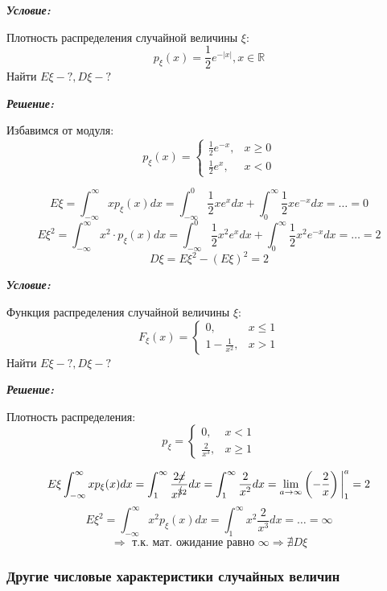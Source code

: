 \begin{exmp}
	\noindent\textit{\textbf{Условие:}}
	
	Плотность распределения случайной величины $\xi$:
	\[
	p_{\xi} (x) = \frac{1}{2} e^{-|x|}, x \in \mathbb{R}
	\]
	Найти $E\xi - ?, D\xi - ?$
	
	\noindent\textit{\textbf{Решение:}}
	
	Избавимся от модуля:
	\[
	p_{\xi}(x) =
	\begin{cases}
		\frac{1}{2} e^{-x}, &x \ge 0 \\
		\frac{1}{2} e^x, &x < 0
	\end{cases}
	\]
	
	\[
	E\xi = \int_{-\infty}^{\infty} x p_{\xi} (x) dx = \int_{-\infty}^{0} \frac{1}{2} x e^x dx + \int_{0}^{\infty} \frac{1}{2} x e^{-x} dx = \dots = 0
	\]
	\[
	E\xi^2 = \int_{-\infty}^{\infty} x^2 \cdot p_{\xi}(x) dx = \int_{-\infty}^{0} \frac{1}{2} x^2 e^x dx + \int_{0}^{\infty} \frac{1}{2} x^2 e^{-x} dx = \dots = 2
	\]
	\[
	D\xi = E\xi^2 - (E\xi)^2 = 2
	\]
\end{exmp}

\begin{exmp}
	\noindent\textit{\textbf{Условие:}}
	
	Функция распределения случайной величины $\xi$:
	\[
	F_{\xi} (x) =
	\begin{cases}
		0, &x \le 1 \\
		1 - \frac{1}{x^2}, &x > 1
	\end{cases}
	\]
	Найти $E\xi - ?, D\xi - ?$
	
	\noindent\textit{\textbf{Решение:}}
	
	Плотность распределения:
	\[
	p_{\xi} =
	\begin{cases}
		0, & x < 1 \\
		\frac{2}{x^3}, &x \ge 1
	\end{cases}
	\]
	
	\[
	E\xi \int_{-\infty}^{\infty} x p_{\xi} (x) dx = \int_{1}^{\infty} \frac{2\cancel{x}}{x^{\cancel{3}2}} dx = \int_{1}^{\infty} \frac{2}{x^2} dx = \lim_{a \to \infty} \left(-\frac{2}{x}\right) \bigg|_{1}^a = 2
	\]
	\[
	E\xi^2 = \int_{-\infty}^{\infty} x^2 p_{\xi}(x) dx = \int_{1}^{\infty} x^2 \frac{2}{x^3} dx = \dots = \infty
	\]
	\[
	\Rightarrow \text{ т.к. мат. ожидание равно } \infty \Rightarrow \nexists D\xi 
	\]
\end{exmp}

\subsubsection{Другие числовые характеристики случайных величин}\label{numerical_characteristics_of_random}


